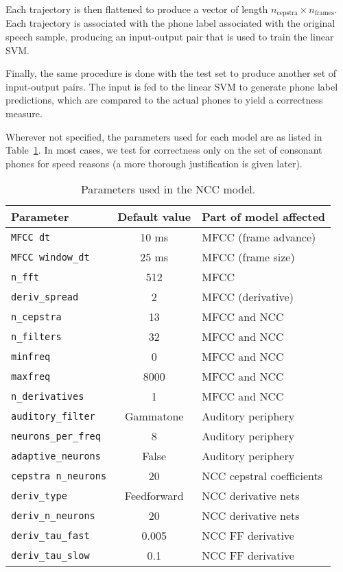 Each trajectory is then flattened
to produce a vector of length
$n_{\text{cepstra}} \times n_{\text{frames}}$.
Each trajectory is associated with
the phone label associated with
the original speech sample,
producing an input-output pair
that is used to train the linear SVM.

Finally, the same procedure is done
with the test set to produce another
set of input-output pairs.
The input is fed to the linear SVM
to generate phone label predictions,
which are compared to the actual phones
to yield a correctness measure.

Wherever not specified,
the parameters used for each model
are as listed in Table~\ref{tab:ncc}.
In most cases, we test for correctness
only on the set of consonant phones
for speed reasons
(a more thorough justification is given
later).

\begin{table}[ht!]
  \begin{footnotesize}
    \begin{center}
      \begin{tabular}{lcl}
        \toprule
        Parameter & Default value & Part of model affected \\
        \midrule
        \texttt{MFCC dt} & 10 ms & MFCC (frame advance) \\
        \texttt{MFCC window\_dt} & 25 ms & MFCC (frame size) \\
        \texttt{n\_fft} & 512 & MFCC \\
        \texttt{deriv\_spread} & 2 & MFCC (derivative) \\
        \texttt{n\_cepstra} & 13 & MFCC and NCC \\
        \texttt{n\_filters} & 32 & MFCC and NCC \\
        \texttt{minfreq} & 0 & MFCC and NCC \\
        \texttt{maxfreq} & 8000 & MFCC and NCC \\
        \texttt{n\_derivatives} & 1 & MFCC and NCC \\
        \texttt{auditory\_filter} & Gammatone & Auditory periphery \\
        \texttt{neurons\_per\_freq} & 8 & Auditory periphery \\
        \texttt{adaptive\_neurons} & False & Auditory periphery \\
        \texttt{cepstra n\_neurons} & 20 & NCC cepstral coefficients \\
        \texttt{deriv\_type} & Feedforward & NCC derivative nets \\
        \texttt{deriv\_n\_neurons} & 20 & NCC derivative nets \\
        \texttt{deriv\_tau\_fast} & 0.005 & NCC FF derivative \\
        \texttt{deriv\_tau\_slow} & 0.1 & NCC FF derivative \\
        \bottomrule
      \end{tabular}
    \end{center}
  \end{footnotesize}
  \caption{Parameters used in the NCC model.}
\label{tab:ncc}
\end{table}

